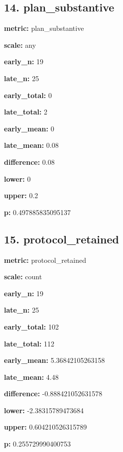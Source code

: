 \documentclass[10pt,a4paper]{article}
\begin{document}
\subsection*{14.\allowbreak{} plan\_\allowbreak{}substantive}
\textbf{metric:} plan\_\allowbreak{}substantive\par
\textbf{scale:} any\par
\textbf{early\_\allowbreak{}n:} 19\par
\textbf{late\_\allowbreak{}n:} 25\par
\textbf{early\_\allowbreak{}total:} 0\par
\textbf{late\_\allowbreak{}total:} 2\par
\textbf{early\_\allowbreak{}mean:} 0\par
\textbf{late\_\allowbreak{}mean:} 0.\allowbreak{}08\par
\textbf{difference:} 0.\allowbreak{}08\par
\textbf{lower:} 0\par
\textbf{upper:} 0.\allowbreak{}2\par
\textbf{p:} 0.\allowbreak{}497885835095137\par
\subsection*{15.\allowbreak{} protocol\_\allowbreak{}retained}
\textbf{metric:} protocol\_\allowbreak{}retained\par
\textbf{scale:} count\par
\textbf{early\_\allowbreak{}n:} 19\par
\textbf{late\_\allowbreak{}n:} 25\par
\textbf{early\_\allowbreak{}total:} 102\par
\textbf{late\_\allowbreak{}total:} 112\par
\textbf{early\_\allowbreak{}mean:} 5.\allowbreak{}36842105263158\par
\textbf{late\_\allowbreak{}mean:} 4.\allowbreak{}48\par
\textbf{difference:} -\allowbreak{}0.\allowbreak{}888421052631578\par
\textbf{lower:} -\allowbreak{}2.\allowbreak{}38315789473684\par
\textbf{upper:} 0.\allowbreak{}604210526315789\par
\textbf{p:} 0.\allowbreak{}255729990400753\par
\end{document}
